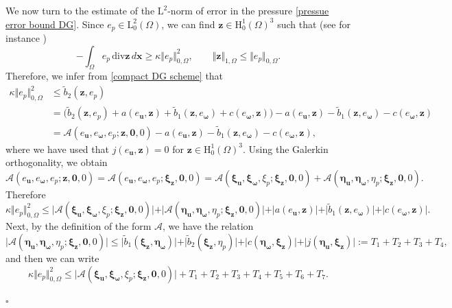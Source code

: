 \documentclass[reqno,a4paper]{article}
\numberwithin{equation}{section}
\newcommand\bu{\boldsymbol{u}}
\newcommand\bx{\boldsymbol{x}}
\newcommand\bz{\boldsymbol{z}}
\renewcommand\O{\Omega}
\renewcommand\H{\mathrm{H}}
\renewcommand\L{\mathrm{L}}
\newcommand\bomega{\boldsymbol{\omega}}
\newcommand\bxi{\boldsymbol{\xi}}
\newcommand\betta{\boldsymbol{\eta}}
\newenvironment{proof}{\noindent{\it Proof.}}{\hfill$\square$}
\begin{document}
\begin{proof}
We now turn to the estimate of the $\L^{2}$-norm of error in the pressure
\eqref{pressue error bound DG}. Since $e_{p}\in\L^{2}_{0}(\Omega)$,
we can find $\bz\in \H^{1}_{0}(\O)^3$ such that (see for instance \cite[Chapter I, Corollary 2.4]{gr-1986})
\begin{equation}\label{inf sup with ep}
 -\int_{\O} e_p \,\mathrm{div} \bz\,d\bx \geq \kappa \Vert e_p\Vert_{0,\O}^{2}, \qquad \Vert\bz\Vert_{1,\O}\leq \Vert e_p\Vert_{0,\O}.
\end{equation}
%
Therefore, we infer from \eqref{compact DG scheme} that 
\begin{align*}
 \kappa \Vert e_p\Vert_{0,\O}^{2} &\leq \tilde b_{2}(\bz, e_p)\nonumber\\
 &=\big(\tilde b_{2}(\bz, e_p)+a(e_{\bu},\bz)+\tilde b_{1}(\bz, e_{\bomega})+c(e_{\bomega},\bz)\big)-a(e_{\bu},\bz)-\tilde b_{1}(\bz, e_{\bomega})-c(e_{\bomega},\bz)\nonumber\\
 &=\mathcal{A}(e_{\bu}, e_{\bomega},e_{p}; \bz,\textbf{0},0)-a(e_{\bu},\bz)-\tilde b_{1}(\bz, e_{\bomega})-c(e_{\bomega},\bz),
\end{align*}
where we have used  that $j(e_{\bu},\bz)=0$ for $\bz\in \H^{1}_{0}(\O)^3$.
Using the Galerkin orthogonality, we obtain  
$$\mathcal{A}(e_{\bu}, e_{\bomega},e_{p}; \bz,\textbf{0},0)= \mathcal{A}(e_{\bu}, e_{\bomega},e_{p}; \bxi_{\bz},\textbf{0},0)=\mathcal{A}(\bxi_{\bu}, \bxi_{\bomega},\xi_{p}; \bxi_{\bz},\textbf{0},0)+\mathcal{A}(\betta_{\bu}, \betta_{\bomega},\eta_{p}; \bxi_{\bz},\textbf{0},0).$$
Therefore 
$$
 \kappa \Vert e_p\Vert_{0,\O}^{2} \leq \vert\mathcal{A}(\bxi_{\bu}, \bxi_{\bomega},\xi_{p}; \bxi_{\bz},\textbf{0},0)\vert+\vert\mathcal{A}(\betta_{\bu}, \betta_{\bomega},\eta_{p}; \bxi_{\bz},\textbf{0},0)\vert+\vert a(e_{\bu},\bz)\vert+\vert\tilde b_{1}(\bz, e_{\bomega})\vert+\vert c(e_{\bomega},\bz)\vert.
$$
% 
Next, by the definition of the form $\mathcal{A}$, we have the relation 
$$
 \vert\mathcal{A}(\betta_{\bu}, \betta_{\bomega},\eta_{p}; \bxi_{\bz},\textbf{0},0)\vert \leq \vert \tilde{b}_{1}(\bxi_{\bz},\betta_{\bomega})\vert +\vert \tilde{b}_{2}(\bxi_{\bz},\eta_{p})\vert + \vert c(\betta_{\bomega}, \bxi_{\bz})\vert +\vert j(\betta_{\bu},\bxi_{\bz})\vert 
 := T_1 + T_2 + T_3 + T_4, 
$$
 and then we can write 
\begin{equation}\label{terms to estim for error on p}
 \kappa \Vert e_p\Vert_{0,\O}^{2} \leq \vert\mathcal{A}(\bxi_{\bu}, \bxi_{\bomega},\xi_{p}; \bxi_{\bz},\textbf{0},0)\vert+T_1 + T_2 + T_3 + T_4 + T_5 + T_6 + T_7.
 \end{equation}
 

\end{proof}
\end{document}
